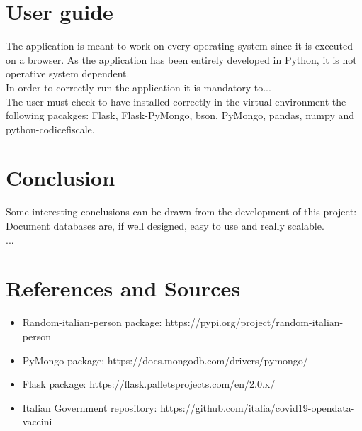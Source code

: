 \documentclass{article}
\begin{document}
\section{User guide}
The application is meant to work on every operating system since it is executed on a browser. As the application has been entirely developed in Python, it is not operative system dependent.
\\In order to correctly run the application it is mandatory to...
\\The user must check to have installed correctly in the virtual environment the following pacakges: {\selectfont Flask, Flask-PyMongo, bson, PyMongo, pandas, numpy and python-codicefiscale}.

\section{Conclusion}

Some interesting conclusions can be drawn from the development of this project: Document databases are, if well designed, easy to use and really scalable. \\

...

\section{References and Sources}
\begin{itemize}
    \item Random-italian-person package: https://pypi.org/project/random-italian-person
    \item PyMongo package: https://docs.mongodb.com/drivers/pymongo/
    \item Flask package: https://flask.palletsprojects.com/en/2.0.x/
    \item Italian Government repository: https://github.com/italia/covid19-opendata-vaccini
\end{itemize}
\end{document}
